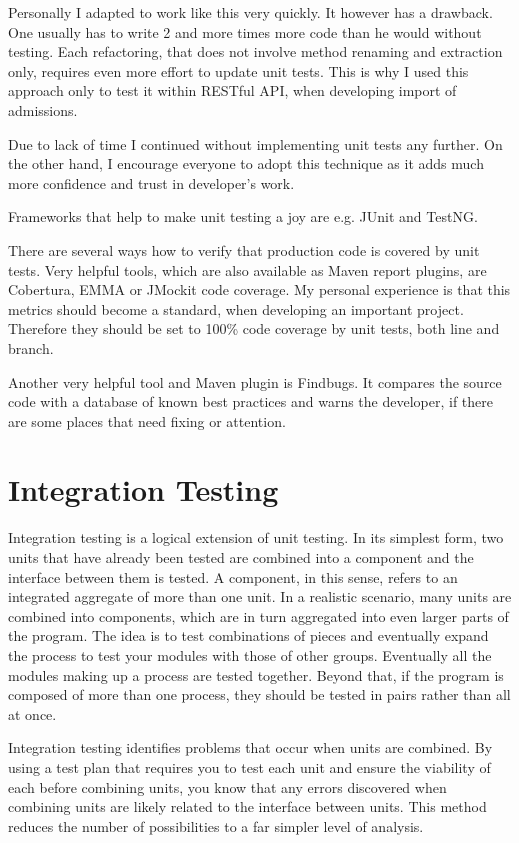 	Personally I adapted to work like this very quickly. It however has a drawback. One usually has to write 2 and more
	times more code than he would without testing. Each refactoring, that does not involve method renaming and extraction
	only, requires even more effort to update unit tests. This is why I used this approach only to test it within RESTful
	API, when developing import of admissions.
	
	Due to lack of time I continued without implementing unit tests any further. On the other hand, I encourage everyone to
	adopt this technique as it adds much more confidence and trust in developer's work.

	Frameworks that help to make unit testing a joy are e.g. JUnit and TestNG.
	
	There are several ways how to verify that production code is covered by unit tests. Very helpful tools, which are
	also available as Maven report plugins, are Cobertura, EMMA or JMockit code coverage. My personal experience is that
	this metrics should become a standard, when developing an important project. Therefore they should be set to
	100\% code coverage by unit tests, both line and branch.
	
	Another very helpful tool and Maven plugin is Findbugs. It compares the source code with a database of known best
	practices and warns the developer, if there are some places that need fixing or attention.

	\section{Integration Testing}
	
	\cite{msdnintegration}
	Integration testing is a logical extension of unit testing. In its simplest form, two units that have already been
	tested are combined into a component and the interface between them is tested. A component, in this sense, refers to an
	integrated aggregate of more than one unit. In a realistic scenario, many units are combined into components, which are
	in turn aggregated into even larger parts of the program. The idea is to test combinations of pieces and eventually
	expand the process to test your modules with those of other groups. Eventually all the modules making up a process are
	tested together. Beyond that, if the program is composed of more than one process, they should be tested in pairs
	rather than all at once.

	Integration testing identifies problems that occur when units are combined. By using a test plan that requires you to
	test each unit and ensure the viability of each before combining units, you know that any errors discovered when
	combining units are likely related to the interface between units. This method reduces the number of possibilities to a
	far simpler level of analysis.
	
